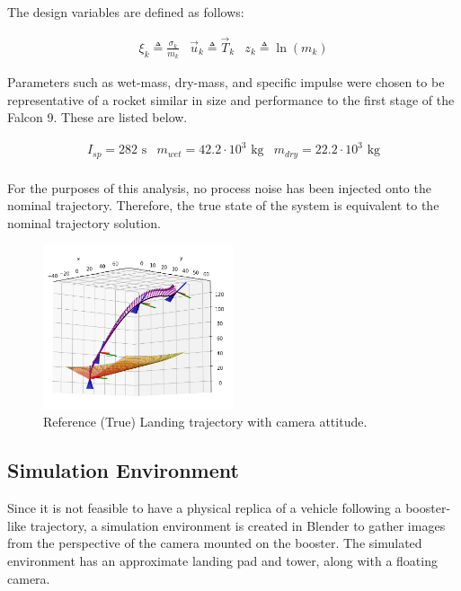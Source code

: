 \documentclass[conference]{IEEEtran}
\begin{document}
The design variables are defined as follows:

\begin{eqnarray*}
    \xi_k \triangleq \frac{\sigma_k}{m_k} & \vec{u}_k \triangleq \vec{T}_k & z_k \triangleq \ln{(m_k)}
\end{eqnarray*}

Parameters such as wet-mass, dry-mass, and specific impulse were chosen to be representative of a rocket similar in size and performance to the first stage of the Falcon 9.
These are listed below.

\begin{eqnarray*}
    I_{sp} = 282 \text{ s} & m_{wet} = 42.2 \cdot 10^3 \text{ kg} & m_{dry} = 22.2 \cdot 10^3 \text{ kg} \\
    
\end{eqnarray*}

For the purposes of this analysis, no process noise has been injected onto the nominal trajectory. Therefore, the true state of the system is equivalent to the nominal trajectory solution. 

\begin{figure}
    \centering
    \includegraphics[width=0.5\textwidth]{rocket_traj.png}
    \caption{Reference (True) Landing trajectory with camera attitude.}
    \label{fig:enter-label}
\end{figure}


\subsection{Simulation Environment}
Since it is not feasible to have a physical replica of a vehicle following a booster-like trajectory, a simulation environment is created in Blender to gather images from the perspective of the camera mounted on the booster. The simulated environment has an approximate landing pad and tower, along with a floating camera.
\end{document}
